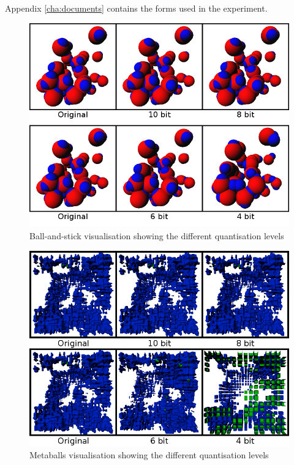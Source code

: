 Appendix \ref{cha:documents} contains the forms used in the experiment.

\begin{figure}
  \begin{center}
    \includegraphics[width=120mm]{ballstick4680}
  \end{center}
  \caption{Ball-and-stick visualisation showing the different quantisation
  levels}
  \label{fig:experiment_ballstick4680}
\end{figure}

\begin{figure}
  \begin{center}
    \includegraphics[width=120mm]{metaballs4680}
  \end{center}
  \caption{Metaballs visualisation showing the different quantisation
  levels}
  \label{fig:experiment_metaballs4680}
\end{figure}

